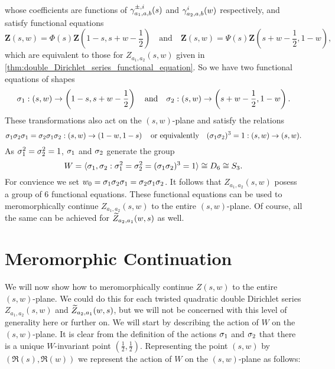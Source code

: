 \documentclass[12pt,reqno,oneside]{amsart}
\begin{document}
    whose coefficients are functions of $\gamma_{a_{1},a,b}^{\pm,i}(s)$ and $\gamma_{a_{2},a,b}^{i}(w)$ respectively, and satisfy functional equations
    \[
        \mathbf{Z}(s,w) = \Phi(s)\mathbf{Z}\left(1-s,s+w-\frac{1}{2}\right) \quad \text{and} \quad \mathbf{Z}(s,w) = \Psi(s)\mathbf{Z}\left(s+w-\frac{1}{2},1-w\right),
    \]
    which are equivalent to those for $Z_{a_{1},a_{2}}(s,w)$ given in \cref{thm:double_Dirichlet_series_functional_equation}. So we have two functional equations of shapes
    \[
        \sigma_{1}:(s,w) \to \left(1-s,s+w-\frac{1}{2}\right) \quad \text{and} \quad \sigma_{2}:(s,w) \to \left(s+w-\frac{1}{2},1-w\right).
    \]
    These transformations also act on the $(s,w)$-plane and satisfy the relations
    \[
        \sigma_{1}\sigma_{2}\sigma_{1} = \sigma_{2}\sigma_{1}\sigma_{2}:(s,w) \to \left(1-w,1-s\right) \quad \text{or equivalently} \quad (\sigma_{1}\sigma_{2})^{3} = 1:(s,w) \to (s,w).
    \]
    As $\sigma_{1}^{2} = \sigma_{2}^{2} = 1$, $\sigma_{1}$ and $\sigma_{2}$ generate the group
    \[
        W = \langle\sigma_{1},\sigma_{2}:\sigma_{1}^{2} = \sigma_{2}^{2} = (\sigma_{1}\sigma_{2})^{3} = 1\rangle \cong D_{6} \cong S_{3}.
    \]
    For convience we set $w_{0} = \sigma_{1}\sigma_{2}\sigma_{1} = \sigma_{2}\sigma_{1}\sigma_{2}$. It follows that $Z_{a_{1},a_{2}}(s,w)$ posess a group of $6$ functional equations. These functional equations can be used to meromorphically continue $Z_{a_{1},a_{2}}(s,w)$ to the entire $(s,w)$-plane. Of course, all the same can be achieved for $\widetilde{Z}_{a_{2},a_{1}}(w,s)$ as well.
\section{Meromorphic Continuation}
    We will now show how to meromorphically continue $Z(s,w)$ to the entire $(s,w)$-plane. We could do this for each twisted quadratic double Dirichlet series $Z_{a_{1},a_{2}}(s,w)$ and $\widetilde{Z}_{a_{2},a_{1}}(w,s)$, but we will not be concerned with this level of generality here or further on. We will start by describing the action of $W$ on the $(s,w)$-plane. It is clear from the definition of the actions $\sigma_{1}$ and $\sigma_{2}$ that there is a unique $W$-invariant point $\left(\frac{1}{2},\frac{1}{2}\right)$. Representing the point $(s,w)$ by $(\Re(s),\Re(w))$ we represent the action of $W$ on the $(s,w)$-plane as follows:
\end{document}
